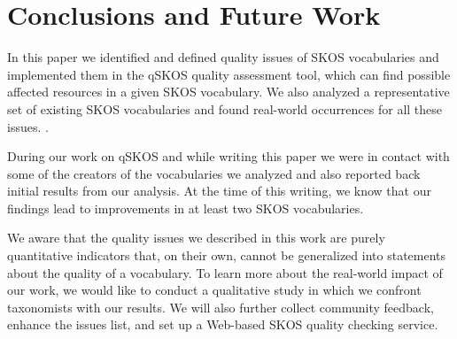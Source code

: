 \section{Conclusions and Future Work}\label{sec:conclusions}

In this paper we identified and defined quality issues of SKOS vocabularies and implemented them in the qSKOS quality assessment tool, which can find possible affected resources in a given SKOS vocabulary. We also analyzed a representative set of existing SKOS vocabularies and found real-world occurrences for all these issues. .

During our work on qSKOS and while writing this paper we were in contact with some of the creators of the vocabularies we analyzed and also reported back initial results from our analysis. At the time of this writing, we know that our findings lead to improvements in at least two SKOS vocabularies.

We aware that the quality issues we described in this work are purely quantitative indicators that, on their own, cannot be generalized into statements about the quality of a vocabulary. To learn more about the real-world impact of our work, we would like to conduct a qualitative study in which we confront taxonomists with our results. We will also further collect community feedback, enhance the issues list, and set up a Web-based SKOS quality checking service.



